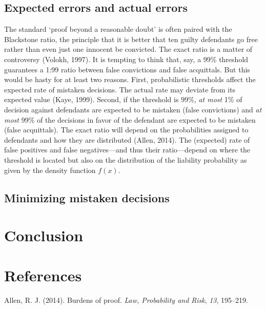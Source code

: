 \documentclass[10pt,dvipsnames]{scrartcl}
\begin{document}
\hypertarget{expected-errors-and-actual-errors}{%
\subsection{Expected errors and actual
errors}\label{expected-errors-and-actual-errors}}

The standard `proof beyond a reasonable doubt' is often paired with the
Blackstone ratio, the principle that it is better that ten guilty
defendants go free rather than even just one innocent be convicted. The
exact ratio is a matter of controversy (Volokh, 1997). It is tempting to
think that, say, a 99\% threshold guarantees a 1:99 ratio between false
convictions and false acquittals. But this would be hasty for at least
two reasons. First, probabilistic thresholds affect the expected rate of
mistaken decisions. The actual rate may deviate from its expected value
(Kaye, 1999). Second, if the threshold is \(99\%\), \textit{at most} 1\%
of decision against defendants are expected to be mistaken (false
convictions) and \textit{at most} 99\% of the decisions in favor of the
defendant are expected to be mistaken (false acquittals). The exact
ratio will depend on the probabilities assigned to defendants and how
they are distributed (Allen, 2014). The (expected) rate of false
positives and false negatives---and thus their ratio---depend on where
the threshold is located but also on the distribution of the liability
probability as given by the density function \(f(x)\).

\hypertarget{minimizing-mistaken-decisions}{%
\subsection{Minimizing mistaken
decisions}\label{minimizing-mistaken-decisions}}

\hypertarget{conclusion-1}{%
\section{Conclusion}\label{conclusion-1}}

\hypertarget{references}{%
\section*{References}\label{references}}

\hypertarget{refs}{}
\leavevmode\hypertarget{ref-allen2014}{}%
Allen, R. J. (2014). Burdens of proof. \emph{Law, Probability and Risk},
\emph{13}, 195--219.
\end{document}
